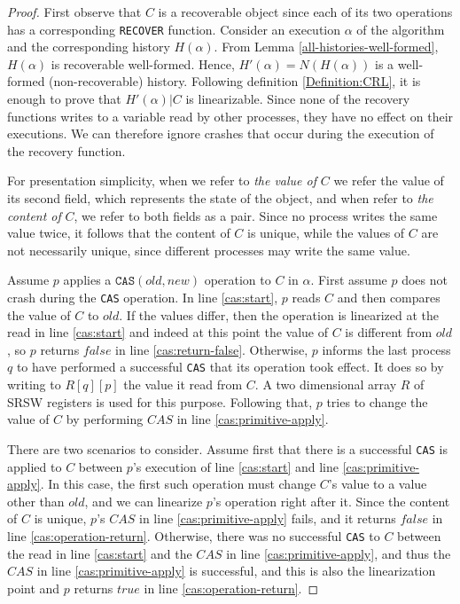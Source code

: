 \begin{proof}

First observe that $C$ is a recoverable object since each of its two operations has a corresponding \texttt{RECOVER} function. Consider an execution $\alpha$ of the algorithm and the corresponding history $H(\alpha)$. From Lemma \ref{all-histories-well-formed}, $H(\alpha)$ is recoverable well-formed. Hence, $H'(\alpha)=N(H(\alpha))$ is a well-formed (non-recoverable) history. Following definition \ref{Definition:CRL}, it is enough to prove that $H'(\alpha) | C$ is  linearizable.
Since none of the recovery functions writes to a variable read by other processes, they have no effect on their executions. We can therefore ignore crashes that occur during the execution of the recovery function.
	
For presentation simplicity, when we refer to \emph{the value of} $C$ we refer the value of its second field, which represents the state of the object, and when refer to \emph{the content of }$C$, we refer to both fields as a pair. Since no process writes the same value twice, it follows that the content of $C$ is unique, while the values of $C$ are not necessarily unique, since different processes may write the same value.
	
	Assume $p$ applies a $\texttt{CAS}(old,new)$ operation to $C$ in $\alpha$. First assume $p$ does not crash during the \texttt{CAS} operation.
	In line \ref{cas:start}, $p$ reads $C$ and then compares the value of $C$ to $old$. If the values differ, then the operation is linearized at the read in line \ref{cas:start} and indeed at this point the value of $C$ is different from $old$, so $p$ returns $false$ in line \ref{cas:return-false}.
	Otherwise, $p$ informs the last process $q$ to have performed a successful \texttt{CAS} that its operation took effect. It does so by writing to $R[q][p]$ the value it read from $C$. A two dimensional array $R$ of SRSW registers is used for this purpose. Following that, $p$ tries to change the value of $C$ by performing $CAS$ in line \ref{cas:primitive-apply}. %
	
	There are two scenarios to consider.
	Assume first that there is a successful \texttt{CAS} is applied to $C$ between $p$'s execution of line \ref{cas:start} and line \ref{cas:primitive-apply}. In this case, the first such operation must change $C$'s value to a value other than $old$, and we can linearize $p$'s operation right after it. Since the content of $C$ is unique, $p$'s $CAS$ in line \ref{cas:primitive-apply} fails, and it returns $false$ in line \ref{cas:operation-return}. Otherwise, there was no successful \texttt{CAS} to $C$ between the read in line \ref{cas:start} and the $CAS$ in line \ref{cas:primitive-apply}, and thus the $CAS$ in line \ref{cas:primitive-apply} is successful, and this is also the linearization point and $p$ returns $true$ in line \ref{cas:operation-return}.
	

\end{proof}
